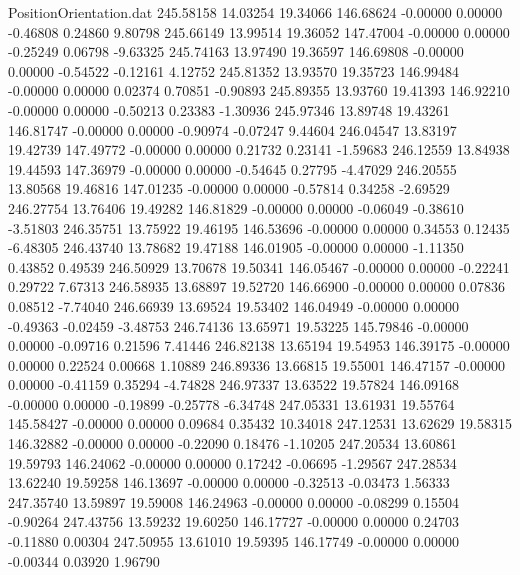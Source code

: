 \begin{filecontents}{PositionOrientation.dat}
 245.58158   14.03254   19.34066   146.68624   -0.00000    0.00000   -0.46808    0.24860    9.80798
 245.66149   13.99514   19.36052   147.47004   -0.00000    0.00000   -0.25249    0.06798   -9.63325
 245.74163   13.97490   19.36597   146.69808   -0.00000    0.00000   -0.54522   -0.12161    4.12752
 245.81352   13.93570   19.35723   146.99484   -0.00000    0.00000    0.02374    0.70851   -0.90893
 245.89355   13.93760   19.41393   146.92210   -0.00000    0.00000   -0.50213    0.23383   -1.30936
 245.97346   13.89748   19.43261   146.81747   -0.00000    0.00000   -0.90974   -0.07247    9.44604
 246.04547   13.83197   19.42739   147.49772   -0.00000    0.00000    0.21732    0.23141   -1.59683
 246.12559   13.84938   19.44593   147.36979   -0.00000    0.00000   -0.54645    0.27795   -4.47029
 246.20555   13.80568   19.46816   147.01235   -0.00000    0.00000   -0.57814    0.34258   -2.69529
 246.27754   13.76406   19.49282   146.81829   -0.00000    0.00000   -0.06049   -0.38610   -3.51803
 246.35751   13.75922   19.46195   146.53696   -0.00000    0.00000    0.34553    0.12435   -6.48305
 246.43740   13.78682   19.47188   146.01905   -0.00000    0.00000   -1.11350    0.43852    0.49539
 246.50929   13.70678   19.50341   146.05467   -0.00000    0.00000   -0.22241    0.29722    7.67313
 246.58935   13.68897   19.52720   146.66900   -0.00000    0.00000    0.07836    0.08512   -7.74040
 246.66939   13.69524   19.53402   146.04949   -0.00000    0.00000   -0.49363   -0.02459   -3.48753
 246.74136   13.65971   19.53225   145.79846   -0.00000    0.00000   -0.09716    0.21596    7.41446
 246.82138   13.65194   19.54953   146.39175   -0.00000    0.00000    0.22524    0.00668    1.10889
 246.89336   13.66815   19.55001   146.47157   -0.00000    0.00000   -0.41159    0.35294   -4.74828
 246.97337   13.63522   19.57824   146.09168   -0.00000    0.00000   -0.19899   -0.25778   -6.34748
 247.05331   13.61931   19.55764   145.58427   -0.00000    0.00000    0.09684    0.35432   10.34018
 247.12531   13.62629   19.58315   146.32882   -0.00000    0.00000   -0.22090    0.18476   -1.10205
 247.20534   13.60861   19.59793   146.24062   -0.00000    0.00000    0.17242   -0.06695   -1.29567
 247.28534   13.62240   19.59258   146.13697   -0.00000    0.00000   -0.32513   -0.03473    1.56333
 247.35740   13.59897   19.59008   146.24963   -0.00000    0.00000   -0.08299    0.15504   -0.90264
 247.43756   13.59232   19.60250   146.17727   -0.00000    0.00000    0.24703   -0.11880    0.00304
 247.50955   13.61010   19.59395   146.17749   -0.00000    0.00000   -0.00344    0.03920    1.96790

\end{filecontents}
